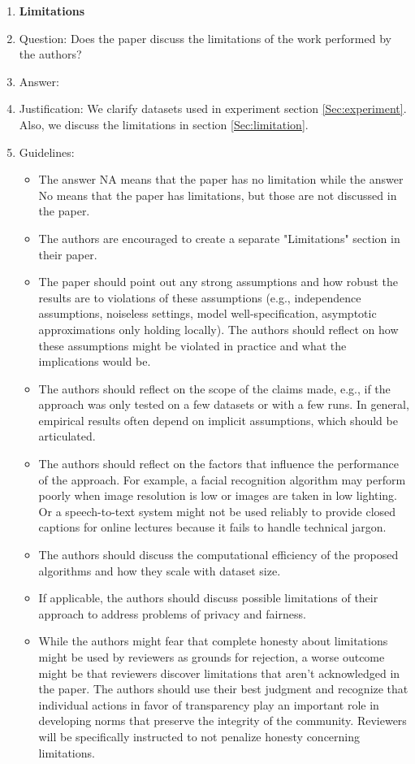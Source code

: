 \documentclass{article}
\begin{document}
\begin{enumerate}
\item {\bf Limitations}
    \item[] Question: Does the paper discuss the limitations of the work performed by the authors?
    \item[] Answer: \answerYes{} %
    \item[] Justification: We clarify datasets used in experiment section \ref{Sec:experiment}. Also, we discuss the limitations in section \ref{Sec:limitation}.
    \item[] Guidelines:
    \begin{itemize}
        \item The answer NA means that the paper has no limitation while the answer No means that the paper has limitations, but those are not discussed in the paper. 
        \item The authors are encouraged to create a separate "Limitations" section in their paper.
        \item The paper should point out any strong assumptions and how robust the results are to violations of these assumptions (e.g., independence assumptions, noiseless settings, model well-specification, asymptotic approximations only holding locally). The authors should reflect on how these assumptions might be violated in practice and what the implications would be.
        \item The authors should reflect on the scope of the claims made, e.g., if the approach was only tested on a few datasets or with a few runs. In general, empirical results often depend on implicit assumptions, which should be articulated.
        \item The authors should reflect on the factors that influence the performance of the approach. For example, a facial recognition algorithm may perform poorly when image resolution is low or images are taken in low lighting. Or a speech-to-text system might not be used reliably to provide closed captions for online lectures because it fails to handle technical jargon.
        \item The authors should discuss the computational efficiency of the proposed algorithms and how they scale with dataset size.
        \item If applicable, the authors should discuss possible limitations of their approach to address problems of privacy and fairness.
        \item While the authors might fear that complete honesty about limitations might be used by reviewers as grounds for rejection, a worse outcome might be that reviewers discover limitations that aren't acknowledged in the paper. The authors should use their best judgment and recognize that individual actions in favor of transparency play an important role in developing norms that preserve the integrity of the community. Reviewers will be specifically instructed to not penalize honesty concerning limitations.
    \end{itemize}


\end{enumerate}
\end{document}
